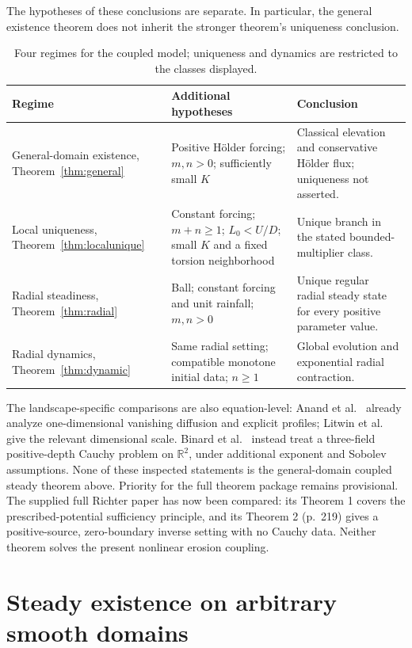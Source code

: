 \documentclass[11pt,a4paper]{article}
\theoremstyle{definition}\newtheorem{definition}[theorem]{Definition}
\theoremstyle{remark}\newtheorem{remark}[theorem]{Remark}
\newcommand{\R}{\mathbb R}\newcommand{\divg}{\operatorname{div}}
\begin{document}
The hypotheses of these conclusions are separate. In particular, the general
existence theorem does not inherit the stronger theorem's uniqueness conclusion.
\begin{table}[ht]
\centering\small
\begin{tabular}{p{.23\linewidth}p{.39\linewidth}p{.28\linewidth}}
\toprule
Regime & Additional hypotheses & Conclusion\\
\midrule
General-domain existence, Theorem~\ref{thm:general} & Positive H\"older forcing; $m,n>0$; sufficiently small $K$ & Classical elevation and conservative H\"older flux; uniqueness not asserted.\\[3pt]
Local uniqueness, Theorem~\ref{thm:localunique} & Constant forcing; $m+n\geq1$; $L_0<U/D$; small $K$ and a fixed torsion neighborhood & Unique branch in the stated bounded-multiplier class.\\[3pt]
Radial steadiness, Theorem~\ref{thm:radial} & Ball; constant forcing and unit rainfall; $m,n>0$ & Unique regular radial steady state for every positive parameter value.\\[3pt]
Radial dynamics, Theorem~\ref{thm:dynamic} & Same radial setting; compatible monotone initial data; $n\geq1$ & Global evolution and exponential radial contraction.\\
\bottomrule
\end{tabular}
\caption{Four regimes for the coupled model; uniqueness and dynamics are restricted to the classes displayed.}\label{tab:regimes}
\end{table}

The landscape-specific comparisons are also equation-level: Anand et al.\
\cite[Section 4.1 and Appendix C]{Anand2023} already analyze one-dimensional
vanishing diffusion and explicit profiles; Litwin et al.\
\cite[Eq.~17]{Litwin2025} give the relevant dimensional scale.
Binard et al.\ \cite[Theorem 1.1]{BDN2024} instead treat a three-field
positive-depth Cauchy problem on $\R^2$, under additional exponent and
Sobolev assumptions. None of these inspected statements is the general-domain
coupled steady theorem above. Priority for the full theorem package remains
provisional. The supplied full Richter paper has now been compared: its Theorem 1 covers the prescribed-potential sufficiency principle, and its Theorem 2 (p.~219) gives a positive-source, zero-boundary inverse setting with no Cauchy data. Neither theorem solves the present nonlinear erosion coupling.

\section{Steady existence on arbitrary smooth domains}
\end{document}
